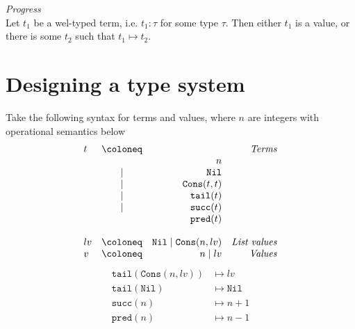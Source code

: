 \begin{theorem}\emph{Progress}\\
  Let $t_1$ be a wel-typed term, i.e. $t_1:\tau$ for some type $\tau$. 
  Then either $t_1$ is a value, or there is some $t_2$ such that $t_1\mapsto t_2$.
\end{theorem}

\section{Designing a type system}
Take the following syntax for terms and values, where $n$ are integers with operational semantics below
\[
  \begin{array}{lcrr}
    t & \coloneq & &\emph{Terms}\\
      &          & n \\
      &\mid      & \mathtt{Nil} \\
      &\mid      & \mathtt{Cons}(t,t) \\
      &\mid      & \mathtt{tail}(t)\\
      &\mid      & \mathtt{succ}(t)\\
      &          & \mathtt{pred}(t)\\
      \\
    lv & \coloneq & \mathtt{Nil}\mid \mathtt{Cons}(n,lv) & \emph{List values}\\
    v & \coloneq & n\mid lv& \emph{Values}\\
  \end{array}
\]
\begin{align*}
  \mathtt{tail}(\mathtt{Cons}(n,lv)) & \mapsto lv\\
  \mathtt{tail}(\mathtt{Nil}) & \mapsto \mathtt{Nil}\\
  \mathtt{succ}(n) & \mapsto n+1\\
  \mathtt{pred}(n) & \mapsto n-1\\ 
\end{align*}
